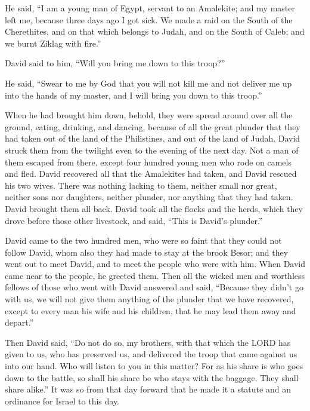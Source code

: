 He said, ``I am a young man of Egypt, servant to an Amalekite; and my
master left me, because three days ago I got sick.  We made
a raid on the South of the Cherethites, and on that which belongs to
Judah, and on the South of Caleb; and we burnt Ziklag with fire.''

 David said to him, ``Will you bring me down to this
troop?''

He said, ``Swear to me by God that you will not kill me and not deliver
me up into the hands of my master, and I will bring you down to this
troop.''

 When he had brought him down, behold, they were spread
around over all the ground, eating, drinking, and dancing, because of
all the great plunder that they had taken out of the land of the
Philistines, and out of the land of Judah.  David struck
them from the twilight even to the evening of the next day. Not a man of
them escaped from there, except four hundred young men who rode on
camels and fled.  David recovered all that the Amalekites
had taken, and David rescued his two wives.  There was
nothing lacking to them, neither small nor great, neither sons nor
daughters, neither plunder, nor anything that they had taken. David
brought them all back.  David took all the flocks and the
herds, which they drove before those other livestock, and said, ``This
is David's plunder.''

 David came to the two hundred men, who were so faint that
they could not follow David, whom also they had made to stay at the
brook Besor; and they went out to meet David, and to meet the people who
were with him. When David came near to the people, he greeted them.
 Then all the wicked men and worthless fellows of those who
went with David answered and said, ``Because they didn't go with us, we
will not give them anything of the plunder that we have recovered,
except to every man his wife and his children, that he may lead them
away and depart.''

 Then David said, ``Do not do so, my brothers, with that
which the LORD has given to us, who has preserved us, and delivered the
troop that came against us into our hand.  Who will listen
to you in this matter? For as his share is who goes down to the battle,
so shall his share be who stays with the baggage. They shall share
alike.''  It was so from that day forward that he made it a
statute and an ordinance for Israel to this day.

